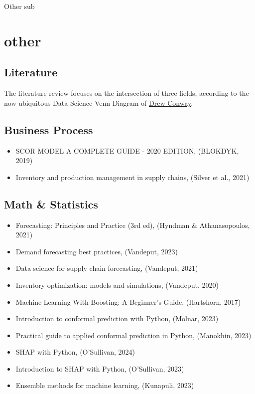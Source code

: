 \documentclass[
  american,
  10,
  a4paper,
]{book}
\providecommand{\tightlist}{%
  \setlength{\itemsep}{0pt}\setlength{\parskip}{0pt}}
\theoremstyle{definition}
\theoremstyle{remark}
\begin{document}
Other sub

\hfill\break

\chapter*{other}\label{other-1}


\section{Literature}\label{sec-literature_review}

The literature review focuses on the intersection of three fields,
according to the now-ubiquitous Data Science Venn Diagram of
\href{http://drewconway.com/zia/2013/3/26/the-data-science-venn-diagram}{Drew
Conway}.

\section{Business Process}\label{business-process}

\begin{itemize}
\tightlist
\item
  SCOR MODEL A COMPLETE GUIDE - 2020 EDITION, (BLOKDYK, 2019)
\item
  Inventory and production management in supply chains, (Silver et al.,
  2021)
\end{itemize}

\section{Math \& Statistics}\label{math-statistics}

\begin{itemize}
\tightlist
\item
  Forecasting: Principles and Practice (3rd ed), (Hyndman \&
  Athanasopoulos, 2021)
\item
  Demand forecasting best practices, (Vandeput, 2023)
\item
  Data science for supply chain forecasting, (Vandeput, 2021)
\item
  Inventory optimization: models and simulations, (Vandeput, 2020)
\item
  Machine Learning With Boosting: A Beginner's Guide, (Hartshorn, 2017)
\item
  Introduction to conformal prediction with Python, (Molnar, 2023)
\item
  Practical guide to applied conformal prediction in Python, (Manokhin,
  2023)
\item
  SHAP with Python, (O'Sullivan, 2024)
\item
  Introduction to SHAP with Python, (O'Sullivan, 2023)
\item
  Ensemble methods for machine learning, (Kunapuli, 2023)
\end{itemize}
\end{document}
